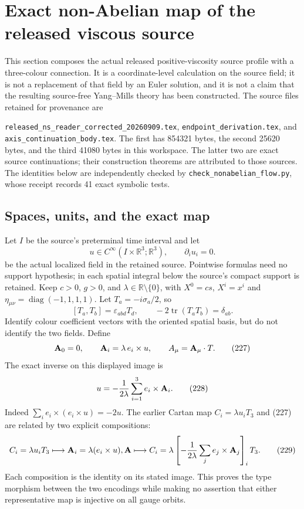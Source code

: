 \section{Exact non-Abelian map of the released viscous source}
\label{sec:nonabelian-fluid-profile}

This section composes the actual released positive-viscosity source
profile with a three-colour connection. It is a coordinate-level
calculation on the source field; it is not a replacement of that field by
an Euler solution, and it is not a claim that the resulting source-free
Yang--Mills theory has been constructed. The source files retained for
provenance are
\begin{sloppypar}
\texttt{released\_ns\allowbreak\_reader\allowbreak\_corrected\allowbreak\_20260909.tex},
\texttt{endpoint\_derivation.tex},
and
\texttt{axis\_continuation\_body.tex}.
The first has 854321 bytes, the second 25620 bytes, and the third 41080
bytes in this workspace. The latter two are exact source continuations;
their construction theorems are attributed to those sources. The
identities below are independently checked by
\texttt{check\_nonabelian\_flow.py}, whose receipt records 41 exact
symbolic tests.
\end{sloppypar}

\subsection{Spaces, units, and the exact map}

Let \(I\) be the source's preterminal time interval and let
\[
 u\in C^\infty(I\times\mathbb R^3;\mathbb R^3),\qquad
 \partial_i u_i=0.
\tag{225}
\]
be the actual localized field in the retained source. Pointwise formulas
need no support hypothesis; in each spatial integral below the source's
compact support is retained. Keep \(c>0\), \(g>0\), and
\(\lambda\in\mathbb R\setminus\{0\}\), with \(X^0=cs\), \(X^i=x^i\) and
\(\eta_{\mu\nu}=\operatorname{diag}(-1,1,1,1)\). Let
\(T_a=-i\sigma_a/2\), so
\[
 [T_a,T_b]=\varepsilon_{abd}T_d,\qquad
 -2\operatorname{tr}(T_aT_b)=\delta_{ab}.
\tag{226}
\]
Identify colour coefficient vectors with the oriented spatial basis, but
do not identify the two fields. Define
\[
 {\bf A}_0=0,\qquad {\bf A}_i=\lambda\,e_i\times u,\qquad
 A_\mu={\bf A}_\mu\cdot T.
\tag{227}
\]
The exact inverse on this displayed image is
\[
 u=-\frac1{2\lambda}\sum_{i=1}^3e_i\times{\bf A}_i.
\tag{228}
\]
Indeed \(\sum_i e_i\times(e_i\times u)=-2u\). The earlier Cartan map
\(C_i=\lambda u_iT_3\) and (227) are related by two explicit compositions:
\[
 C_i=\lambda u_iT_3\longmapsto {\bf A}_i=\lambda(e_i\times u),
 {\bf A}\longmapsto
 C_i=\lambda\left[-\frac1{2\lambda}\sum_j e_j\times{\bf A}_j\right]_iT_3.
\tag{229}
\]
Each composition is the identity on its stated image. This proves the
type morphism between the two encodings while making no assertion that
either representative map is injective on all gauge orbits.

